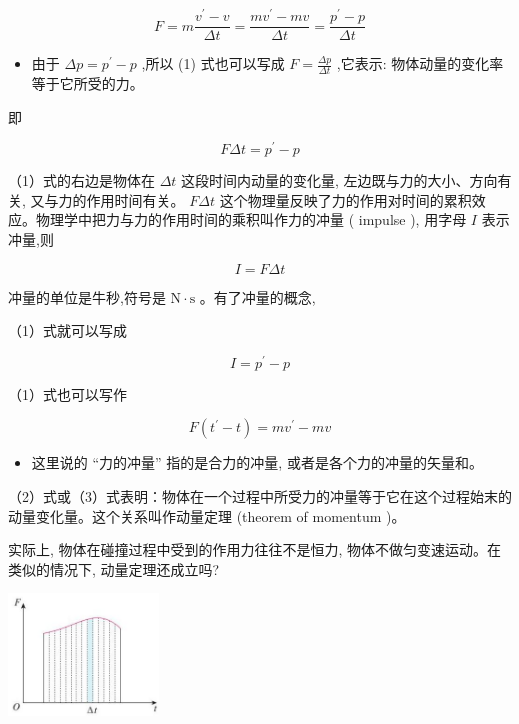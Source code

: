 \documentclass[10pt]{article}
\begin{document}
\[
F = m\frac{{v}^{\prime } - v}{\Delta t} = \frac{m{v}^{\prime } - {mv}}{\Delta t} = \frac{{p}^{\prime } - p}{\Delta t}
\]

\begin{mdframed}

\begin{itemize}
\item 由于 \({\Delta p} = {p}^{\prime } - p\) ,所以 (1) 式也可以写成 \(F = \frac{\Delta p}{\Delta t}\) ,它表示: 物体动量的变化率等于它所受的力。
\end{itemize}

\end{mdframed}

即

\[
{F\Delta t} = {p}^{\prime } - p \tag{1}
\]

（1）式的右边是物体在 \({\Delta t}\) 这段时间内动量的变化量, 左边既与力的大小、方向有关, 又与力的作用时间有关。 \({F\Delta t}\) 这个物理量反映了力的作用对时间的累积效应。物理学中把力与力的作用时间的乘积叫作力的冲量 ( impulse ), 用字母 \(I\) 表示冲量,则

\[
I = {F\Delta t}
\]

冲量的单位是牛秒,符号是 \(\mathrm{N} \cdot \mathrm{s}\) 。有了冲量的概念,

（1）式就可以写成

\[
I = {p}^{\prime } - p \tag{2}
\]

（1）式也可以写作

\[
F\left( {{t}^{\prime } - t}\right) = m{v}^{\prime } - {mv} \tag{3}
\]

\begin{mdframed}

\begin{itemize}
\item 这里说的 “力的冲量” 指的是合力的冲量, 或者是各个力的冲量的矢量和。
\end{itemize}

\end{mdframed}

（2）式或（3）式表明：物体在一个过程中所受力的冲量等于它在这个过程始末的动量变化量。这个关系叫作动量定理 (theorem of momentum )。

实际上, 物体在碰撞过程中受到的作用力往往不是恒力, 物体不做匀变速运动。在类似的情况下, 动量定理还成立吗?

\begin{center}
\includegraphics[max width=0.3\textwidth]{images/01910e4c-ebb8-7d2c-8f2f-2375bc1d2d12_12_137637.jpg}
\end{center}
\end{document}
